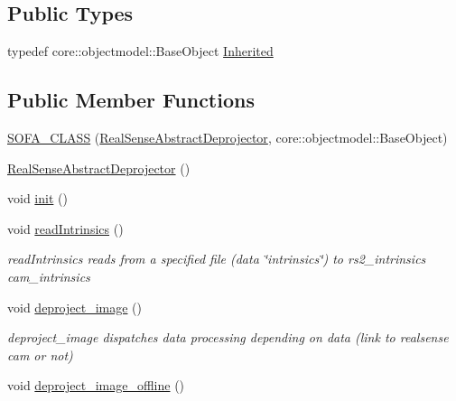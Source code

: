 \subsection*{Public Types}
\begin{DoxyCompactItemize}
\item 
typedef core\+::objectmodel\+::\+Base\+Object \hyperlink{classsofa_1_1rgbdtracking_1_1_real_sense_abstract_deprojector_a9b4cae154f99cca58b05da9c4b0084ab}{Inherited}
\end{DoxyCompactItemize}
\subsection*{Public Member Functions}
\begin{DoxyCompactItemize}
\item 
\hyperlink{classsofa_1_1rgbdtracking_1_1_real_sense_abstract_deprojector_a595c10a0bf6eb93a562e9cb12dd269b7}{S\+O\+F\+A\+\_\+\+C\+L\+A\+SS} (\hyperlink{classsofa_1_1rgbdtracking_1_1_real_sense_abstract_deprojector}{Real\+Sense\+Abstract\+Deprojector}, core\+::objectmodel\+::\+Base\+Object)
\item 
\hyperlink{classsofa_1_1rgbdtracking_1_1_real_sense_abstract_deprojector_ab427c89296422fbb9184ecf328b9c05d}{Real\+Sense\+Abstract\+Deprojector} ()
\item 
void \hyperlink{classsofa_1_1rgbdtracking_1_1_real_sense_abstract_deprojector_ac809ca0096bb6ec5f003194ecef42533}{init} ()
\item 
void \hyperlink{classsofa_1_1rgbdtracking_1_1_real_sense_abstract_deprojector_a9b933303db901af2174388a524b671a1}{read\+Intrinsics} ()
\begin{DoxyCompactList}\small\item\em read\+Intrinsics reads from a specified file (data \char`\"{}intrinsics\char`\"{}) to rs2\+\_\+intrinsics cam\+\_\+intrinsics \end{DoxyCompactList}\item 
void \hyperlink{classsofa_1_1rgbdtracking_1_1_real_sense_abstract_deprojector_a7b8c549b1df30b374c1431594bcac52b}{deproject\+\_\+image} ()
\begin{DoxyCompactList}\small\item\em deproject\+\_\+image dispatches data processing depending on data (link to realsense cam or not) \end{DoxyCompactList}\item 
void \hyperlink{classsofa_1_1rgbdtracking_1_1_real_sense_abstract_deprojector_ac0889ca4dee6e9980f9f28909d6f3ba6}{deproject\+\_\+image\+\_\+offline} ()

\end{DoxyCompactItemize}
